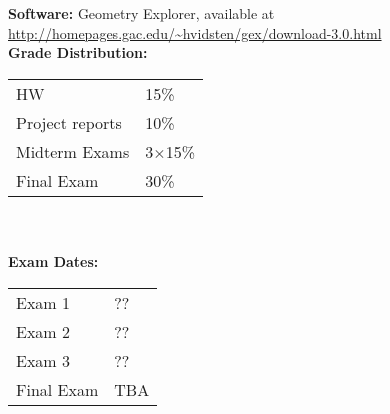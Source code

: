 \documentclass[11pt]{article}
\begin{document}
\textbf{\large Software:} Geometry Explorer, available at \url{ http://homepages.gac.edu/~hvidsten/gex/download-3.0.html}\\



\textbf {\large Grade Distribution:} \\
\hspace*{40mm}
\begin{tabular}{ l l }
HW & 15\% \\
Project reports & 10\% \\
Midterm Exams  & 3$\times$15\% \\
Final Exam  & 30\%
\end{tabular} \\\\

\textbf{Exam Dates:}\\
\begin{tabular}{l l}
	Exam 1 & ??\\
	Exam 2 & ??\\
	Exam 3 & ??\\
	Final Exam & TBA
\end{tabular} \\\\

\end{document}
